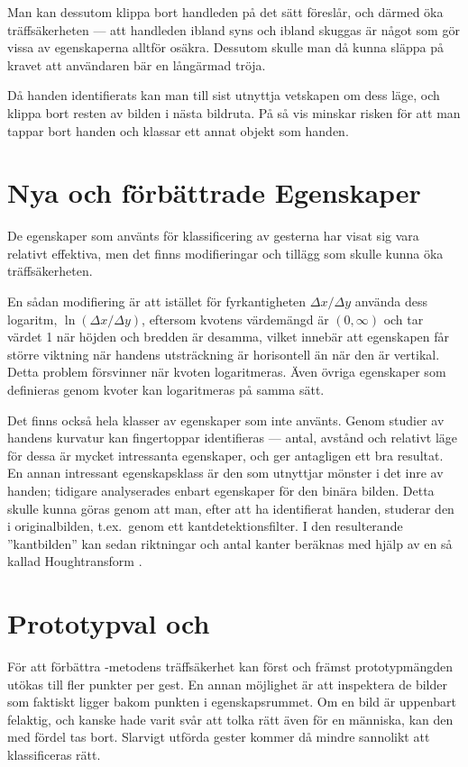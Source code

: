 \documentclass[../rapport_MVEX01-11-05]{subfiles}
\begin{document}
Man kan dessutom klippa bort handleden på det sätt
 föreslår, och därmed öka träffsäkerheten --- att
handleden ibland syns och ibland skuggas är något som gör vissa av 
egenskaperna alltför osäkra. Dessutom skulle man då kunna släppa på kravet
att användaren bär en långärmad tröja.

Då handen identifierats kan man till sist utnyttja
vetskapen om dess läge, och
klippa bort resten av bilden i nästa bildruta.
På så vis minskar risken för att man tappar bort handen och
klassar ett annat objekt som handen.

\section{Nya och förbättrade Egenskaper}
De egenskaper som använts för klassificering av gesterna har visat sig vara relativt
effektiva, men det finns modifieringar och tillägg som skulle kunna
öka träffsäkerheten. 

En sådan modifiering är att istället för fyrkantigheten $\Delta
x/\Delta y$ använda dess logaritm, $\ln(\Delta x/\Delta
y)$, eftersom kvotens värdemängd är $(0,\infty)$ och tar värdet 1 när
höjden och bredden är desamma, vilket innebär att egenskapen får större
viktning när handens utsträckning är horisontell än när den är vertikal. Detta problem
försvinner när kvoten logaritmeras. Även övriga egenskaper som
definieras genom kvoter kan logaritmeras på samma sätt.

Det finns också hela klasser av egenskaper som inte använts.
Genom studier av handens kurvatur kan fingertoppar 
identifieras --- antal, avstånd och relativt läge för dessa är
mycket intressanta egenskaper, och ger antagligen ett bra resultat.
En annan intressant egenskapsklass är den som utnyttjar mönster i det
inre av handen; tidigare analyserades enbart egenskaper för den binära bilden.
Detta skulle kunna göras
genom att man, efter att ha identifierat handen, studerar den
i originalbilden, t.ex.~genom ett kantdetektionsfilter.
I den resulterande ''kantbilden'' kan sedan riktningar och antal kanter
beräknas med hjälp av en så kallad Houghtransform \cite{Duda72}.

\section{Prototypval och \knn}
För att förbättra \knn-metodens träffsäkerhet kan först och
främst prototypmängden utökas till fler punkter per gest. En annan
möjlighet är att inspektera de bilder som faktiskt ligger bakom
punkten i egenskapsrummet. Om en bild är uppenbart felaktig, och kanske hade varit
svår att tolka rätt även för en människa, kan den med fördel tas bort.
Slarvigt utförda gester kommer då mindre sannolikt att
klassificeras rätt.
\end{document}
